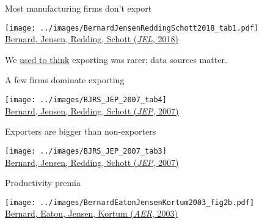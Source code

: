 \documentclass[10pt,notes=hide]{beamer}
\begin{document}
\begin{frame}{Most manufacturing firms don't export}
\begin{center}\texttt{[image: ../images/BernardJensenReddingSchott2018\_tab1.pdf]} \\ {\scriptsize \href{https://pubs.aeaweb.org/doi/pdf/10.1257/jel.20160792}{Bernard, Jensen, Redding, Schott (\emph{JEL}, 2018)}}\end{center}
\vspace{-1mm}
{\footnotesize We \href{https://tradediversion.net/2018/11/11/what-share-of-us-manufacturing-firms-export/}{used to think} exporting was rarer; data sources matter.\par}
\end{frame}
\begin{frame}{A few firms dominate exporting}
\begin{center}\texttt{[image: ../images/BJRS\_JEP\_2007\_tab4]} \\ {\scriptsize \href{https://www.aeaweb.org/articles.php?doi=10.1257/jep.21.3.105}{Bernard, Jensen, Redding, Schott (\emph{JEP}, 2007)}}\end{center}
\end{frame}
\begin{frame}{Exporters are bigger than non-exporters}
\begin{center}\texttt{[image: ../images/BJRS\_JEP\_2007\_tab3]}  \\ {\scriptsize \href{https://www.aeaweb.org/articles.php?doi=10.1257/jep.21.3.105}{Bernard, Jensen, Redding, Schott (\emph{JEP}, 2007)}} \end{center}
\end{frame}
\begin{frame}{Productivity premia}
\begin{center}\texttt{[image: ../images/BernardEatonJensenKortum2003\_fig2b.pdf]}  \\ {\scriptsize \href{}{Bernard, Eaton, Jensen, Kortum (\textit{AER}, 2003)}} \end{center}
\end{frame}
\end{document}

